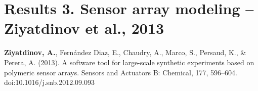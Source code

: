 
\thispagestyle{empty}


\begingroup
\let\clearpage\relax
\let\cleardoublepage\relax
\let\cleardoublepage\relax

\vspace*{3cm}

  {
    \section{Results 3. Sensor array modeling -- Ziyatdinov et al., 2013}\label{pub3}
  }

\medskip

\noindent \textbf{Ziyatdinov, A.}, Fern\'{a}ndez Diaz, E., Chaudry, A., Marco, S., Persaud, 
K., \& Perera, A. (2013). 
A software tool for large-scale synthetic experiments based on polymeric sensor arrays. 
Sensors and Actuators B: Chemical, 177, 596--604. doi:10.1016/j.snb.2012.09.093
\cite{Ziyatdinov2013a}

\endgroup			

\vfill
